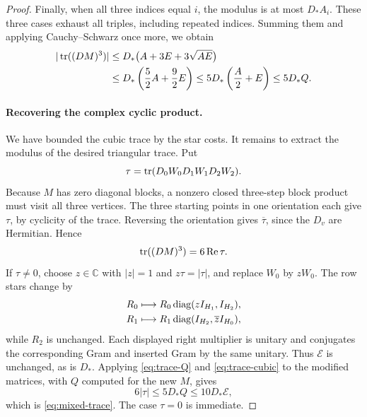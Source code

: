 \begin{proof}
Finally, when all three indices equal $i$, the modulus is at most
$D_*A_i$. These three cases exhaust all triples, including repeated
indices. Summing them and applying Cauchy--Schwarz once more, we obtain
\begin{equation}\label{eq:trace-cubic}
 \begin{aligned}
 |\operatorname{tr}((DM)^3)|
 &\le D_*\bigl(A+3E+3\sqrt{AE}\bigr)\\
 &\le D_*\left(\frac52A+\frac92E\right)
 \le 5D_*\left(\frac A2+E\right)
 \le5D_*Q.
 \end{aligned}
\end{equation}

\paragraph{Recovering the complex cyclic product.}
We have bounded the cubic trace by the star costs. It remains to
extract the modulus of the desired triangular trace. Put
\[
 \tau=\operatorname{tr}(D_0W_0D_1W_1D_2W_2).
\]
Because $M$ has zero diagonal blocks, a nonzero closed three-step
block product must visit all three vertices. The three starting
points in one orientation each give $\tau$, by cyclicity of the
trace. Reversing the orientation gives $\overline\tau$, since the
$D_v$ are Hermitian. Hence
\[
 \operatorname{tr}((DM)^3)=6\operatorname{Re}\tau.
\]
If $\tau\ne0$, choose $z\in\mathbb C$ with $|z|=1$ and
$z\tau=|\tau|$, and replace $W_0$ by $zW_0$. The row stars change by
\[
 \begin{aligned}
 R_0&\longmapsto
 R_0\operatorname{diag}(zI_{H_1},I_{H_2}),\\
 R_1&\longmapsto
 R_1\operatorname{diag}(I_{H_2},\overline zI_{H_0}),
 \end{aligned}
\]
while $R_2$ is unchanged. Each displayed right multiplier is unitary
and conjugates the corresponding Gram and inserted Gram by the same
unitary. Thus $\mathcal E$ is unchanged, as is $D_*$.
Applying \eqref{eq:trace-Q} and \eqref{eq:trace-cubic} to the modified
matrices, with $Q$ computed for the new $M$, gives
\[
 6|\tau|\le5D_*Q\le10D_*\mathcal E,
\]
which is \eqref{eq:mixed-trace}. The case $\tau=0$ is immediate.
\end{proof}
